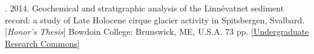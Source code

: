 \begin{etaremune} [itemsep=4pt, leftmargin=3ex]
    \item \ghedwards. 2014. Geochemical and stratigraphic analysis of the Linnévatnet sediment record: a study of Late Holocene cirque glacier activity in Spitsbergen, Svalbard. [\textit{Honor’s Thesis}] Bowdoin College: Brunswick, ME, U.S.A. 73 pp. [\href{https://digitalcommons.bowdoin.edu/honorsprojects/12/}{Undergraduate Research Commons}]
\end{etaremune}
